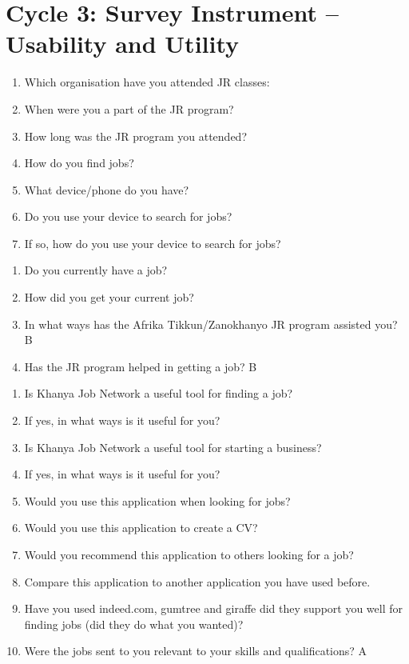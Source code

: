 \chapter{Cycle 3: Survey Instrument – Usability and Utility}
\label{app:survey_instrument}



\begin{enumerate}
\item Which organisation have you attended JR classes:
\item When were you a part of the JR program?
\item How long was the JR program you attended?
\item How do you find jobs?
\item What device/phone do you have?
\item Do you use your device to search for jobs?
\item If so, how do you use your device to search for jobs?
\end{enumerate}



\begin{enumerate}
\item Do you currently have a job?
\item How did you get your current job?
\item In what ways has the Afrika Tikkun/Zanokhanyo JR program assisted you? B
\item Has the JR program helped in getting a job? B
\end{enumerate}



\begin{enumerate}
\item Is Khanya Job Network a useful tool for finding a job?
\item If yes, in what ways is it useful for you?
\item Is Khanya Job Network a useful tool for starting a business?
\item If yes, in what ways is it useful for you?
\item Would you use this application when looking for jobs?
\item Would you use this application to create a CV?
\item Would you recommend this application to others looking for a job?
\item Compare this application to another application you have used before.
\item Have you used indeed.com, gumtree and giraffe did they support you well for finding jobs (did they do what you wanted)?
\item Were the jobs sent to you relevant to your skills and qualifications? A
\end{enumerate}

